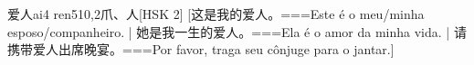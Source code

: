 \begin{EntryWithPhonetic}{爱人}{ai4 ren5}{10,2}{⽖、⼈}[HSK 2]
  [这是我的爱人。===Este é o meu/minha esposo/companheiro. | 她是我一生的爱人。===Ela é o amor da minha vida. | 请携带爱人出席晚宴。===Por favor, traga seu cônjuge para o jantar.]
\end{EntryWithPhonetic}

